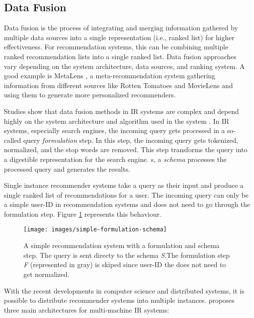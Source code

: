 \subsection{Data Fusion}
\label{subsec:data-fusion}
Data fusion is the process of integrating and merging information gathered by multiple data sources into a single representation (i.e., ranked list) for higher effectiveness. For recommendation systems, this can be combining multiple ranked recommendation lists into a single ranked list. Data fusion approaches vary depending on the system architecture, data sources, and ranking system. A good example is MetaLens \cite{schaferMetarecommendationSystemsUsercontrolled2002}, a meta-recommendation system gathering information from different sources like Rotten Tomatoes and MovieLens and using them to generate more personalized recommenders.


Studies show that data fusion methods in IR systems are complex and depend highly on the system architecture and algorithm used in the system \cite{frankhsuComparingRankScore2005}. In IR systems, especially search engines, the incoming query gets processed in a so-called query \emph{formulation} step. In this step, the incoming query gets tokenized, normalized,  and the stop words are removed. This step transforms the query into a digestible representation for the search engine. s, a \emph{schema} processes the processed query and generates the results. 


Single instance recommender systems take a query as their input and produce a single ranked list of recommendations for a user. The incoming query can only be a simple user-ID in recommendation systems and does not need to go through the formulation step. Figure \ref{fig:data-fusion-simple} represents this behaviour.


\begin{figure}[!htb]
    \centering
    \texttt{[image: images/simple-formulation-schema]}
    \caption{A simple recommendation system with a formulation and schema step. The query is sent directy to the schema \emph{S}.The formulation step \emph{F} (represented in gray) is skiped since user-ID the does not need to get normalized.}
    \label{fig:data-fusion-simple}
\end{figure}


With the recent developments in computer science and distributed systems, it is possible to distribute recommender systems into multiple instances. \cite{frankhsuComparingRankScore2005} proposes three main architectures for multi-machine IR systems:

